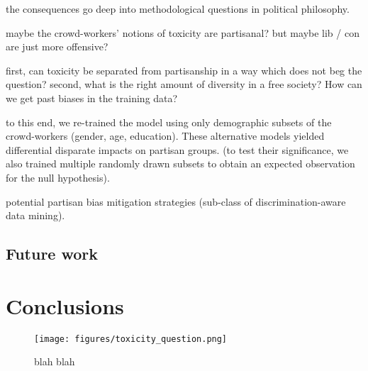 \documentclass[sigconf]{acmart}
\begin{document}
the consequences go deep into methodological questions in political philosophy.

maybe the crowd-workers’ notions of toxicity are partisanal?
but maybe lib / con are just more offensive?

first, can toxicity be separated from partisanship in a way which does not beg the question?
second, what is the right amount of diversity in a free society?
How can we get past biases in the training data?

to this end, we re-trained the model using only demographic subsets of the crowd-workers (gender, age, education). These alternative models yielded differential disparate impacts on partisan groups. (to test their significance, we also trained multiple randomly drawn subsets to obtain an expected observation for the null hypothesis).

potential partisan bias mitigation strategies (sub-class of discrimination-aware data mining).

\subsection{Future work}

\section{Conclusions}

\begin{figure}[h!]
\begin{center}
\texttt{[image: figures/toxicity\_question.png]}
\caption{blah blah}\label{fig:method}
\end{center}
\end{figure}





\medskip
\end{document}

